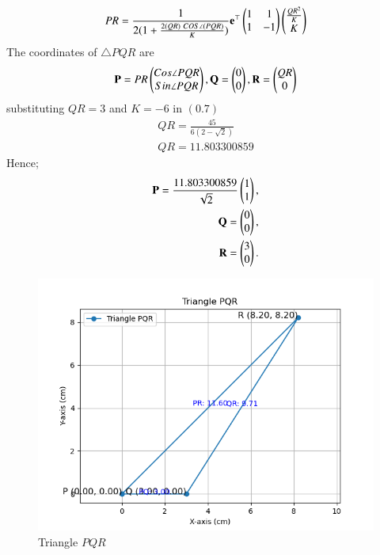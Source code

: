 \documentclass[journal]{IEEEtran}
\begin{document}
\begin{align}
    PR = \frac{1}{2(1+\frac{2(QR)\ COS \angle(PQR)}{K})} \Vec{e}^\top \myvec{1 &1\\ 1 & -1} \myvec{\frac{QR^2}{K}\\ K}
\end{align}
The coordinates of $\triangle PQR$ are
\begin{align}
    \mathbf P = PR \begin{pmatrix}Cos\angle PQR\\ Sin \angle PQR\end{pmatrix} , \mathbf Q = \begin{pmatrix}0 \\ 0\end{pmatrix} , \mathbf R = \begin{pmatrix}QR \\ 0\end{pmatrix}
\end{align}
substituting $QR = 3$ and $K=-6$ in $(0.7)$
\begin{align}
    QR = \frac{45}{6(2-\sqrt{2})}\\
    QR = 11.803300859
\end{align}
Hence;
\begin{align}
    \mathbf{P} = \frac{11.803300859}{\sqrt{2}} \begin{pmatrix}1 \\ 1\end{pmatrix}, \\
    \mathbf{Q} = \begin{pmatrix}0 \\ 0\end{pmatrix}, \\
    \mathbf{R} = \begin{pmatrix}3 \\ 0\end{pmatrix}.
\end{align}
\begin{figure}[h!]
   \centering
   \includegraphics[width=0.7\linewidth]{figs/triangle_plot.png}
   \caption{Triangle $PQR$}
\end{figure}
\end{document}
